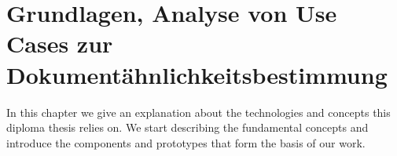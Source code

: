 \chapter{Grundlagen, Analyse von Use Cases zur Dokument\"ahnlichkeitsbestimmung }
\label{chap:Grundlagen}

In this chapter we give an explanation about the technologies and concepts this diploma thesis relies on. We start describing the fundamental concepts and introduce the components and prototypes that form the basis of our work.





